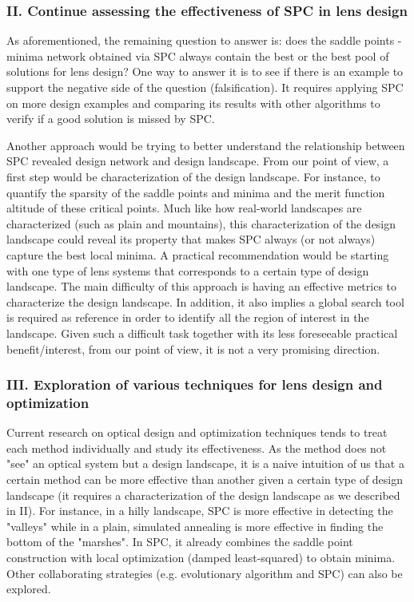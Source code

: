 \subsubsection{II. Continue assessing the effectiveness of SPC in lens design}

As aforementioned, the remaining question to answer is: does the saddle points - minima network obtained via SPC always contain the best or the best pool of solutions for lens design? One way to answer it is to see if there is an example to support the negative side of the question (falsification). It requires applying SPC on more design examples and comparing its results with other algorithms to verify if a good solution is missed by SPC. 

Another approach would be trying to better understand the relationship between SPC revealed design network and design landscape. From our point of view, a first step would be characterization of the design landscape. For instance, to quantify the sparsity of the saddle points and minima and the merit function altitude of these critical points. Much like how real-world landscapes are characterized (such as plain and mountains), this characterization of the design landscape could reveal its property that makes SPC always (or not always) capture the best local minima. A practical recommendation would be starting with one type of lens systems that corresponds to a certain type of design landscape. The main difficulty of this approach is having an effective metrics to characterize the design landscape. In addition, it also implies a global search tool is required as reference in order to identify all the region of interest in the landscape. Given such a difficult task together with its less foreseeable practical benefit/interest, from our point of view, it is not a very promising direction. 

\subsubsection{III. Exploration of various techniques for lens design and optimization}

Current research on optical design and optimization techniques tends to treat each method individually and study its effectiveness. As the method does not "see" an optical system but a design landscape, it is a naive intuition of us that a certain method can be more effective than another given a certain type of design landscape (it requires a characterization of the design landscape as we described in II). For instance, in a hilly landscape, SPC is more effective in detecting the "valleys" while in a plain, simulated annealing is more effective in finding the bottom of the "marshes". In SPC, it already combines the saddle point construction with local optimization (damped least-squared) to obtain minima. Other collaborating strategies (e.g. evolutionary algorithm and SPC) can also be explored.

